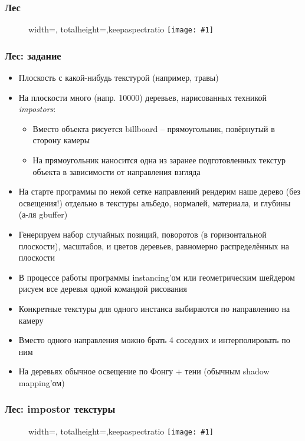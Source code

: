 \documentclass{beamer}
\newcommand{\slideimage}[1]{
  \begin{figure}
    \begin{adjustbox}{width=\textwidth, totalheight=\textheight-2\baselineskip-2\baselineskip,keepaspectratio}
      \texttt{[image: \#1]}
    \end{adjustbox}
  \end{figure}
}
\begin{document}
\begin{frame}
\frametitle{Лес}
\slideimage{impostors-forest.jpg}
\end{frame}

\begin{frame}[fragile]
\frametitle{Лес: задание}
\fontsize{8pt}{8pt}
\selectfont
\begin{itemize}
\item Плоскость с какой-нибудь текстурой (например, травы)
\item На плоскости много (напр. 10000) деревьев, нарисованных техникой \textit{impostors}:
\begin{itemize}
\fontsize{8pt}{8pt}
\selectfont
\item Вместо объекта рисуется billboard -- прямоугольник, повёрнутый в сторону камеры
\item На прямоугольник наносится одна из заранее подготовленных текстур объекта в зависимости от направления взгляда
\end{itemize}
\item На старте программы по некой сетке направлений рендерим наше дерево (без освещения!) отдельно в текстуры альбедо, нормалей, материала, и глубины (а-ля gbuffer)
\item Генерируем набор случайных позиций, поворотов (в горизонтальной плоскости), масштабов, и цветов деревьев, равномерно распределённых на плоскости
\item В процессе работы программы instancing'ом или геометрическим шейдером рисуем все деревья одной командой рисования
\item Конкретные текстуры для одного инстанса выбираются по направлению на камеру
\item Вместо одного направления можно брать 4 соседних и интерполировать по ним
\item На деревьях обычное освещение по Фонгу + тени (обычным shadow mapping'ом)
\end{itemize}
\end{frame}

\begin{frame}
\frametitle{Лес: impostor текстуры}
\slideimage{impostor-textures.jpg}
\end{frame}
\end{document}
